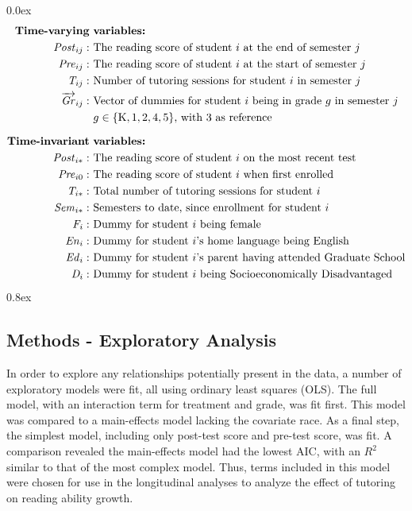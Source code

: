 \documentclass[a0,landscape]{a0poster}
\begin{document}
\begin{multicols}{3}
\parskip 0.0ex
\begin{align*}
\text{\textbf{Time-varying}} & \text{ \textbf{variables:}} \\
\mathit{Post}_{ij}: & \text{ The reading score of student } i \text{ at the end of semester } j \\
\mathit{Pre}_{ij}: & \text{ The reading score of student } i \text{ at the start of semester } j \\
\mathit{T}_{ij}: & \text{ Number of tutoring sessions for student } i  \text{ in semester } j \\
\overrightarrow{\mathit{Gr}}_{ij}: & \text{ Vector of dummies for student } i 
      \text{ being in grade } g \text{ in semester } j \\
  & ~ g \in \{\mathrm{K}, 1, 2, 4, 5\} \text {, with 3 as reference}  \\[1.5ex]
\text{\textbf{Time-invariant}} & \text{ \textbf{variables:}} \\
\mathit{Post}_{i*}: & \text{ The reading score of student } i \text{ on the most recent test } \\
\mathit{Pre}_{i0}: & \text{ The reading score of student } i \text{ when first enrolled } \\
\mathit{T}_{i*}: & \text{ Total number of tutoring sessions for student } i \\
\mathit{Sem}_{i*}: & \text{ Semesters to date, since enrollment for student } i \\
\mathit{F}_{i}: & \text{ Dummy for student } i  \text{ being female } \\ 
\mathit{En}_{i}: & \text{ Dummy for student } i \text{'s home language being English } \\ 
\mathit{Ed}_{i}: & \text{ Dummy for student } i \text{'s parent having attended Graduate School} \\ 
\mathit{D}_{i}: & \text{ Dummy for student } i \text{ being Socioeconomically Disadvantaged } \\ 
\end{align*}
\parskip 0.8ex

\subsection*{Methods - Exploratory Analysis}

In order to explore any relationships potentially present
in the data, a number of exploratory models were fit,
all using ordinary least squares (OLS).
The full model, with an interaction term for treatment and grade,
was fit first. This model was compared to a main-effects model
lacking the covariate race.
As a final step, the simplest model, including only
post-test score and pre-test score, was fit.
A comparison revealed the main-effects model had the lowest AIC,
with an $R^{2}$ similar to that of the most complex model.
Thus, terms included in this model were chosen for use in the
longitudinal analyses to analyze the effect of tutoring on
reading ability growth.


\end{multicols}
\end{document}
